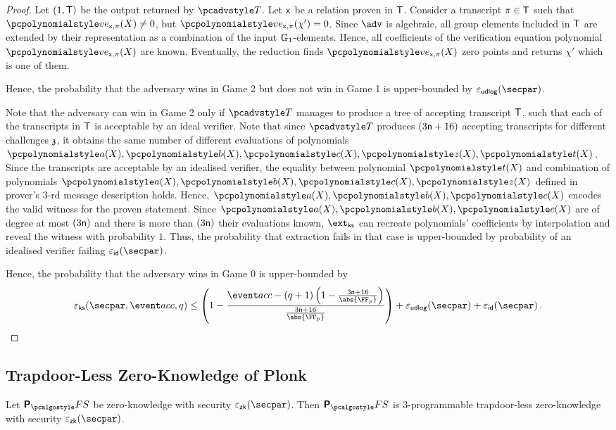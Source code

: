 \begin{proof}
  Let $(1, \mathsf{T})$ be the output returned by $\tdv$. Let $\mathsf{x}$ be a relation proven in $\mathsf{T}$.  Consider a transcript $\pi \in \mathsf{T}$ such that $\vereq_{\inp, \zkproof}(X) \neq 0$, but $\vereq_{\inp, \zkproof}(\chi') = 0$. Since $\adv$ is algebraic, all group elements included in $\mathsf{T}$ are extended by their representation as a combination of the input $\mathbb{G}_1$-elements. Hence, all coefficients of the verification equation polynomial $\vereq_{\inp, \zkproof}(X)$ are known. 
  Eventually, the reduction finds $\vereq_{\inp, \zkproof}(X)$ zero points and returns $\chi'$ which is one of them.
    
  Hence, the probability that the adversary wins in Game 2 but does not win in Game 1 is upper-bounded by $\epsudlog (\secpar)$.

  Note that the adversary can win in Game 2 only if $\tdv$ manages to produce a tree of accepting transcript $\mathsf{T}$, such that each of the transcripts in $\mathsf{T}$ is acceptable by an ideal verifier. Note that since $\tdv$ produces $(3 \mathsf{n} + 16)$ accepting transcripts for different challenges $\mathfrak{z}$, it obtains the same number of different evaluations of polynomials $\p{a} (X), \p{b} (X), \p{c} (X), \p{z} (X), \p{t} (X)$. Since the transcripts are acceptable by an idealised verifier, the equality between polynomial $\p{t} (X)$ and combination of polynomials $\p{a} (X), \p{b} (X), \p{c} (X), \p{z} (X)$ defined in prover's $3$-rd message description holds. Hence, $\p{a} (X), \p{b} (X), \p{c} (X)$ encodes the valid witness for the proven statement. Since $\p{a} (X), \p{b} (X), \p{c} (X)$ are of degree at most $(3 \mathsf{n})$ and there is more than $(3 \mathsf{n})$ their evaluations known, $\extcss$ can recreate polynomials' coefficients by interpolation and reveal the witness with probability $1$. Thus, the probability that extraction fails in that case is upper-bounded by probability of an idealised verifier failing $\epsid(\secpar)$.

  Hence, the probability that the adversary wins in Game 0 is upper-bounded by 
  \[
    \epscss(\secpar,\accProb, q) \leq \left(1 - \frac{\accProb - (q + 1) \left(1 - \frac{3 \noofc + 16}{\abs{\FF_p}} \right)}{\frac{3 \noofc + 16}{\abs{\FF_p}}}\right) + \epsudlog (\secpar) + \epsid (\secpar)\,. 
  \]
 \end{proof}
  

\subsection{Trapdoor-Less Zero-Knowledge of Plonk}
\begin{lemma}
  \label{lem:plonk_tlzk}
  Let $\plonkprotfs$ be zero-knowledge with security $\epszk(\secpar)$. Then $\plonkprotfs$ is 3-programmable trapdoor-less zero-knowledge
  with security $\epszk(\secpar)$.
\end{lemma}


